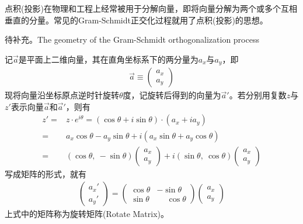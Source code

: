 \begin{example}
  点积(投影)在物理和工程上经常被用于分解向量，即将向量分解为两个或多个互相垂直的分量。常见的Gram-Schmidt正交化过程就用了点积(投影)的思想。

  \color{red}待补充。The geometry of the Gram-Schmidt orthogonalization process
\end{example}

\begin{example}[平面向量的旋转]
  记$\vec a$是平面上二维向量，其在直角坐标系下的两分量为$a_x$与$a_y$，即
  \begin{align*}
    \vec a\equiv
    \begin{pmatrix}
      a_x\\ a_y
    \end{pmatrix}
  \end{align*}
  现将向量沿坐标原点逆时针旋转$\theta$度，记旋转后得到的向量为$\vec a'$。若分别用复数$z$与$z'$表示向量$\vec a$和$\vec a'$，则有
  \begin{align*}
    z' ={}& z\cdot e^{i\theta} = (\cos\theta + i\sin\theta)\cdot (a_x + i a_y)\\
       ={}& a_x \cos\theta - a_y \sin\theta + i(a_x \sin\theta + a_y \cos\theta)\\
       ={}& (\cos\theta,\ -\sin\theta)\begin{pmatrix}a_x\\a_y\end{pmatrix} + i
            (\sin\theta,\  \cos\theta)\begin{pmatrix}a_x\\a_y\end{pmatrix}
  \end{align*}
  写成矩阵的形式，就有
  \begin{align*}
    \begin{pmatrix}
      a_x'\\ a_y'
    \end{pmatrix}=
    \begin{pmatrix}
      \cos\theta & -\sin\theta\\
      \sin\theta & \phantom{-}\cos\theta
    \end{pmatrix}
    \begin{pmatrix}
      a_x\\ a_y
    \end{pmatrix}
  \end{align*}
  上式中的矩阵称为旋转矩阵(Rotate Matrix)。
\end{example}

